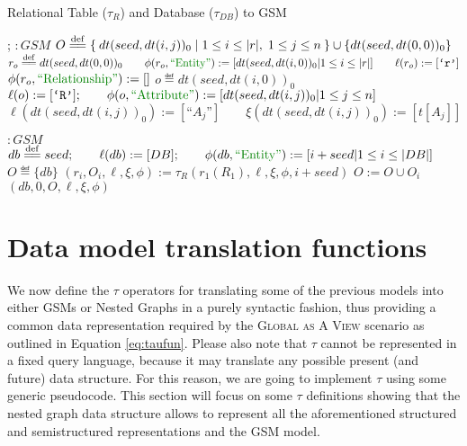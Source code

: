 \begin{algorithm}[!t]
	\caption{Relational Table ($\tau_R$) and Database ($\tau_{DB}$) to GSM}\label{alg:reltonested}
	{
		\begin{minipage}{\linewidth}
			\begin{algorithmic}[1]
				;
				\State
				 $\colon GSM$ 
				\State $O\overset{\mathrm{def}}{=\mathrel{\mkern-3mu}=}\Set{dt(seed,dt(i, j))_0|1\leq i\leq |r|,\;1\leq j\leq n}\cup\{ dt(seed,dt(0,0))_0\}$
				\State $r_o\eqdef dt(seed,dt(0,0))_0\qquad \phi(r_o,\ONTA):=[dt(seed,dt(i,0))_0|1\leq i\leq |r|]\qquad \ell(r_o):=[\texttt{`r'}]$
				\State $\phi(r_o,\RELA):=[]$  
				\State $o\eqdef dt(seed,dt(i, 0))_0$
				\State $\ell(o):=[\texttt{`R'}];\qquad \phi(o,\ATTR):=[dt(seed,dt(i, j))_0| 1\leq j\leq n]$
				\State $\ell(dt(seed,dt(i, j))_0):=[\texttt{``}{A_j}\texttt{''}]\qquad \xi(dt(seed,dt(i, j))_0):=[t[A_j]]$
				\EndFor 
				\EndFor
				\State {}
				\EndFunction
				
				\State
				 $\colon GSM$ 
				\State $db\eqdef seed;\qquad \ell(db):=[DB];\qquad \phi(db,\ONTA):=[i+seed|1\leq i\leq |DB|]$
				\State $O \eqdef\{db\}$
				\State $(r_i,O_i,\ell,\xi,\phi):=\tau_R(r_1(R_1),\ell,\xi,\phi,i+seed)$
				\State $O:= O\cup O_i$
				\EndFor
				\State \Return $(db,0,O,\ell,\xi,\phi)$
				\EndFunction
			\end{algorithmic}
	\end{minipage}}
\end{algorithm}
\section{Data model translation functions}\label{sec:tautonesting}
We now define  the $\tau$ operators for translating some of the previous models into either GSMs or Nested Graphs in a purely syntactic fashion, thus providing a common data representation required by the \textsc{Global as A View} scenario as outlined in Equation \vref{eq:taufun}. Please also note that $\tau$ cannot be represented in a fixed query language, because it may translate any possible present (and future) data structure. For this reason, we are going to implement $\tau$ using some generic pseudocode. This section will focus on some $\tau$ definitions showing that the nested graph data structure allows to represent all the aforementioned structured and semistructured representations and the GSM model.

